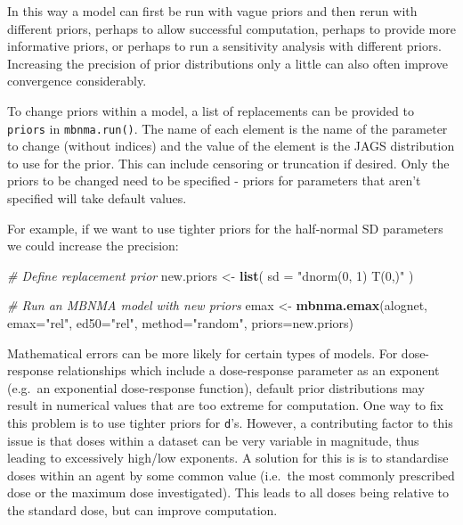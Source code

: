 \documentclass[]{article}
\newenvironment{Shaded}{\begin{snugshade}}{\end{snugshade}}
\newcommand{\CommentTok}[1]{\textcolor[rgb]{0.56,0.35,0.01}{\textit{#1}}}
\newcommand{\DataTypeTok}[1]{\textcolor[rgb]{0.13,0.29,0.53}{#1}}
\newcommand{\KeywordTok}[1]{\textcolor[rgb]{0.13,0.29,0.53}{\textbf{#1}}}
\newcommand{\NormalTok}[1]{#1}
\newcommand{\StringTok}[1]{\textcolor[rgb]{0.31,0.60,0.02}{#1}}
\begin{document}
In this way a model can first be run with vague priors and then rerun
with different priors, perhaps to allow successful computation, perhaps
to provide more informative priors, or perhaps to run a sensitivity
analysis with different priors. Increasing the precision of prior
distributions only a little can also often improve convergence
considerably.

To change priors within a model, a list of replacements can be provided
to \texttt{priors} in \texttt{mbnma.run()}. The name of each element is
the name of the parameter to change (without indices) and the value of
the element is the JAGS distribution to use for the prior. This can
include censoring or truncation if desired. Only the priors to be
changed need to be specified - priors for parameters that aren't
specified will take default values.

For example, if we want to use tighter priors for the half-normal SD
parameters we could increase the precision:

\begin{Shaded}
\begin{Highlighting}[]
\CommentTok{# Define replacement prior}
\NormalTok{new.priors <-}\StringTok{ }\KeywordTok{list}\NormalTok{(}
  \DataTypeTok{sd =} \StringTok{"dnorm(0, 1) T(0,)"}
\NormalTok{  )}

\CommentTok{# Run an MBNMA model with new priors}
\NormalTok{emax <-}\StringTok{ }\KeywordTok{mbnma.emax}\NormalTok{(alognet, }\DataTypeTok{emax=}\StringTok{"rel"}\NormalTok{, }\DataTypeTok{ed50=}\StringTok{"rel"}\NormalTok{, }\DataTypeTok{method=}\StringTok{"random"}\NormalTok{,}
                   \DataTypeTok{priors=}\NormalTok{new.priors)}
\end{Highlighting}
\end{Shaded}

Mathematical errors can be more likely for certain types of models. For
dose-response relationships which include a dose-response parameter as
an exponent (e.g.~an exponential dose-response function), default prior
distributions may result in numerical values that are too extreme for
computation. One way to fix this problem is to use tighter priors for
\texttt{d}'s. However, a contributing factor to this issue is that doses
within a dataset can be very variable in magnitude, thus leading to
excessively high/low exponents. A solution for this is is to standardise
doses within an agent by some common value (i.e.~the most commonly
prescribed dose or the maximum dose investigated). This leads to all
doses being relative to the standard dose, but can improve computation.
\end{document}

